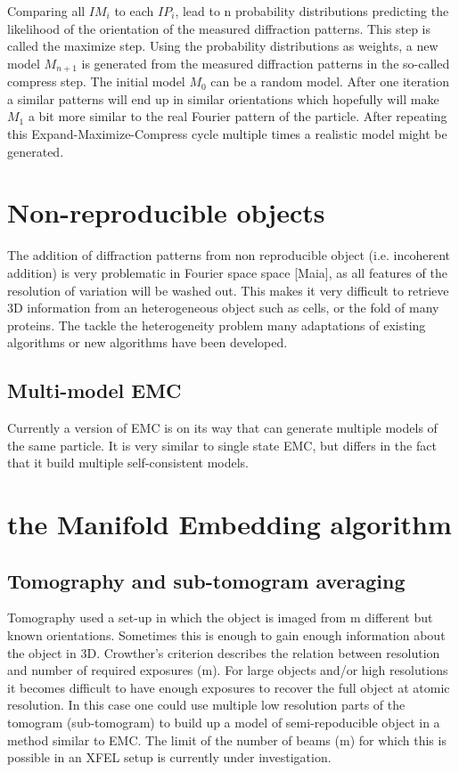 Comparing all $IM_i$ to each $IP_i$, lead to n probability distributions predicting the likelihood of the orientation of the measured diffraction patterns. This step is called the maximize step. Using the probability distributions as weights, a new model $M_{n+1}$ is generated from the measured diffraction patterns in the so-called compress step. 
The initial model $M_0$ can be a random model. After one iteration a similar patterns will end up in similar orientations which hopefully will make $M_1$ a bit more similar to the real Fourier pattern of the particle. After repeating this Expand-Maximize-Compress cycle multiple times a realistic model might be generated.

\section{Non-reproducible objects}
The addition of diffraction patterns from non reproducible object (i.e. incoherent addition) is very problematic in Fourier space space [Maia], as all features of the resolution of variation will be washed out. This makes it very difficult to retrieve 3D information from an heterogeneous object such as cells, or the fold of many proteins. The tackle the heterogeneity problem many adaptations of existing algorithms or new algorithms have been developed.

\subsection{Multi-model EMC}
Currently a version of EMC is on its way that can generate multiple models of the same particle. It is very similar to single state EMC, but differs in the fact that it build multiple self-consistent models. 

\section{the Manifold Embedding algorithm}


\subsection{Tomography and sub-tomogram averaging}
Tomography used a set-up in which the object is imaged from m different but known orientations. Sometimes this is enough to gain enough information about the object in 3D. Crowther's criterion describes the relation between resolution and number of required exposures (m). For large objects and/or high resolutions it becomes difficult to have enough exposures to recover the full object at atomic resolution. In this case one could use multiple low resolution parts of the tomogram (sub-tomogram) to build up a model of semi-repoducible object in a method similar to EMC. The limit of the number of beams (m) for which this is possible in an XFEL setup is currently under investigation.

